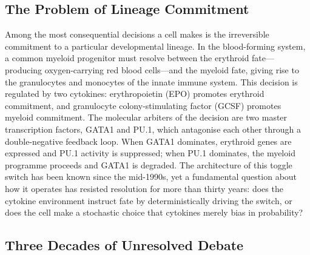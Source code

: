 
\subsection{The Problem of Lineage Commitment}

Among the most consequential decisions a cell makes is the irreversible
commitment to a particular developmental lineage. In the blood-forming system, a
common myeloid progenitor must resolve between the erythroid fate---producing
oxygen-carrying red blood cells---and the myeloid fate, giving rise to the
granulocytes and monocytes of the innate immune system. This decision is
regulated by two cytokines: erythropoietin (EPO) promotes erythroid commitment,
and granulocyte colony-stimulating factor (GCSF) promotes myeloid commitment.
The molecular arbiters of the decision are two master transcription factors,
GATA1 and PU.1, which antagonise each other through a double-negative feedback
loop. When GATA1 dominates, erythroid genes are expressed and PU.1 activity is
suppressed; when PU.1 dominates, the myeloid programme proceeds and GATA1 is
degraded. The architecture of this toggle switch has been known since the
mid-1990s, yet a fundamental question about how it operates has resisted
resolution for more than thirty years: does the cytokine environment instruct
fate by deterministically driving the switch, or does the cell make a stochastic
choice that cytokines merely bias in probability?

\subsection{Three Decades of Unresolved Debate}

